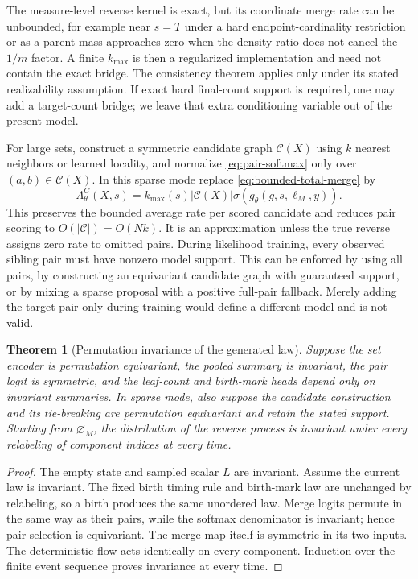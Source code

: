 \documentclass[10pt]{article}
\newtheorem{theorem}{Theorem}[section]
\theoremstyle{definition}
\theoremstyle{remark}
\newcommand{\emptyconfig}{\varnothing_M}
\begin{document}
The measure-level reverse kernel is exact, but its coordinate merge rate can
be unbounded, for example near $s=T$ under a hard endpoint-cardinality
restriction or as a parent mass approaches zero when the density ratio does
not cancel the $1/m$ factor.  A finite $k_{\max}$ is then a regularized
implementation and need not contain the exact bridge.  The consistency
theorem applies only under its stated realizability assumption.  If exact hard final-count support is required,
one may add a target-count bridge; we leave that extra conditioning variable
out of the present model.

For large sets, construct a symmetric candidate graph $\mathcal C(X)$ using
$k$ nearest neighbors or learned locality, and normalize
\eqref{eq:pair-softmax} only over $(a,b)\in\mathcal C(X)$.  In this sparse
mode replace \eqref{eq:bounded-total-merge} by
\begin{equation}
  \Lambda_\theta^C(X,s)
  =k_{\max}(s)|\mathcal C(X)|
   \sigma\!\left(g_\theta(g,s,\ell_M,y)\right).
  \label{eq:sparse-total-merge}
\end{equation}
This preserves the bounded average rate per scored candidate and reduces
pair scoring to $O(|\mathcal C|)=O(Nk)$.  It is an approximation unless the
true reverse assigns zero rate to omitted pairs.
During likelihood training, every observed sibling pair must have nonzero
model support.  This can be enforced by using all pairs, by constructing an
equivariant candidate graph with guaranteed support, or by mixing a sparse
proposal with a positive full-pair fallback.  Merely adding the target pair
only during training would define a different model and is not valid.

\begin{theorem}[Permutation invariance of the generated law]
\label{thm:permutation}
Suppose the set encoder is permutation equivariant, the pooled summary is
invariant, the pair logit is symmetric, and the leaf-count and birth-mark
heads depend only on invariant summaries.  In sparse mode, also suppose the
candidate construction and its tie-breaking are permutation equivariant and
retain the stated support.  Starting from $\emptyconfig$, the
distribution of the reverse process is invariant under every relabeling of
component indices at every time.
\end{theorem}

\begin{proof}
The empty state and sampled scalar $L$ are invariant.  Assume the current law
is invariant.  The fixed birth timing rule and birth-mark law are unchanged
by relabeling, so a birth produces the same unordered law.  Merge logits
permute in the same way as their pairs, while the softmax denominator is
invariant; hence pair selection is equivariant.  The merge map itself is
symmetric in its two inputs.  The deterministic flow acts identically on
every component.  Induction over the finite event sequence proves invariance
at every time.
\end{proof}
\end{document}
